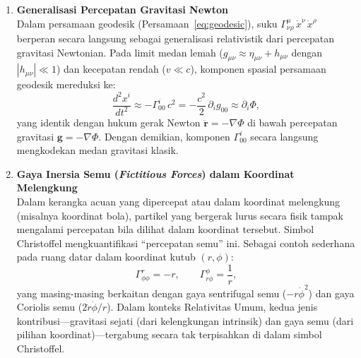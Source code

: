 \begin{enumerate}[label=(\alph*), wide=0pt, leftmargin=*]
    \item \textbf{Generalisasi Percepatan Gravitasi Newton}\\
    Dalam persamaan geodesik (Persamaan~\ref{eq:geodesic}), suku $\Gamma^\mu_{\nu\rho}\,\dot{x}^\nu\,\dot{x}^\rho$ berperan secara langsung sebagai generalisasi relativistik dari percepatan gravitasi Newtonian. Pada limit medan lemah ($g_{\mu\nu} \approx \eta_{\mu\nu} + h_{\mu\nu}$ dengan $|h_{\mu\nu}| \ll 1$) dan kecepatan rendah ($v \ll c$), komponen spasial persamaan geodesik mereduksi ke:
    \begin{equation}
        \frac{d^2 x^i}{dt^2} \approx -\Gamma^i_{00}\, c^2 = -\frac{c^2}{2}\, \partial_i g_{00} \approx \partial_i \Phi,
        \label{eq:christoffel-newton-limit}
    \end{equation}
    yang identik dengan hukum gerak Newton $\ddot{\mathbf{r}} = -\nabla\Phi$ di bawah percepatan gravitasi $\mathbf{g} = -\nabla\Phi$. Dengan demikian, komponen $\Gamma^i_{00}$ secara langsung mengkodekan medan gravitasi klasik.

    \item \textbf{Gaya Inersia Semu (\textit{Fictitious Forces}) dalam Koordinat Melengkung}\\
    Dalam kerangka acuan yang dipercepat atau dalam koordinat melengkung (misalnya koordinat bola), partikel yang bergerak lurus secara fisik tampak mengalami percepatan bila dilihat dalam koordinat tersebut. Simbol Christoffel mengkuantifikasi ``percepatan semu'' ini. Sebagai contoh sederhana pada ruang datar dalam koordinat kutub $(r, \phi)$:
    \begin{equation}
        \Gamma^r_{\phi\phi} = -r, \qquad \Gamma^\phi_{r\phi} = \frac{1}{r},
    \end{equation}
    yang masing-masing berkaitan dengan gaya sentrifugal semu ($-r\dot{\phi}^2$) dan gaya Coriolis semu ($2\dot{r}\dot{\phi}/r$). Dalam konteks Relativitas Umum, kedua jenis kontribusi---gravitasi sejati (dari kelengkungan intrinsik) dan gaya semu (dari pilihan koordinat)---tergabung secara tak terpisahkan di dalam simbol Christoffel.


\end{enumerate}
